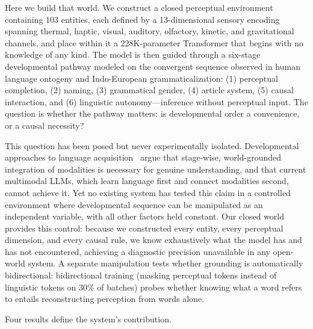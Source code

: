 \documentclass{article}
\begin{document}
Here we build that world. We construct a closed perceptual environment containing 103 entities, each defined by a 13-dimensional sensory encoding spanning thermal, haptic, visual, auditory, olfactory, kinetic, and gravitational channels, and place within it a 228K-parameter Transformer that begins with no knowledge of any kind. The model is then guided through a six-stage developmental pathway modeled on the convergent sequence observed in human language ontogeny and Indo-European grammaticalization: (1) perceptual completion, (2) naming, (3) grammatical gender, (4) article system, (5) causal interaction, and (6) linguistic autonomy---inference without perceptual input. The question is whether the pathway matters: is developmental order a convenience, or a causal necessity?

This question has been posed but never experimentally isolated. Developmental approaches to language acquisition~\citep{farkas2025} argue that stage-wise, world-grounded integration of modalities is necessary for genuine understanding, and that current multimodal LLMs, which learn language first and connect modalities second, cannot achieve it. Yet no existing system has tested this claim in a controlled environment where developmental sequence can be manipulated as an independent variable, with all other factors held constant. Our closed world provides this control: because we constructed every entity, every perceptual dimension, and every causal rule, we know exhaustively what the model has and has not encountered, achieving a diagnostic precision unavailable in any open-world system. A separate manipulation tests whether grounding is automatically bidirectional: bidirectional training (masking perceptual tokens instead of linguistic tokens on 30\% of batches) probes whether knowing what a word refers to entails reconstructing perception from words alone.

Four results define the system's contribution.
\end{document}
